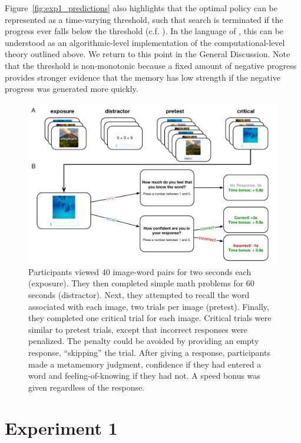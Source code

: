 Figure~\ref{fig:exp1_predictions} also highlights that the optimal policy can be represented as a time-varying threshold, such that search is terminated if the progress ever falls below the threshold (c.f. \citealp{drugowitsch2012cost}). In the language of \citet{marr1982vision}, this can be understood as an algorithmic-level implementation of the computational-level theory outlined above. We return to this point in the General Discussion. Note that the threshold is non-monotonic because a fixed amount of negative progress provides stronger evidence that the memory has low strength if the negative progress was generated more quickly.

\begin{figure}[htb!]
  \centering
  \includegraphics[width=\textwidth]{figs/memory/task_exp1.pdf}
  \caption{ 
     Participants viewed 40 image-word pairs for two seconds each (exposure). They then completed simple math problems for 60 seconds (distractor). Next, they attempted to recall the word associated with each image, two trials per image (pretest). Finally, they completed one critical trial for each image.
     Critical trials were similar to pretest trials, except that incorrect responses were penalized. The penalty could be avoided by providing an empty response, ``skipping'' the trial. After giving a response, participants made a metamemory judgment, confidence if they had entered a word and feeling-of-knowing if they had not. A speed bonus was given regardless of the response.}
  \label{fig:task-exp1}
\end{figure}

\section{Experiment 1}

